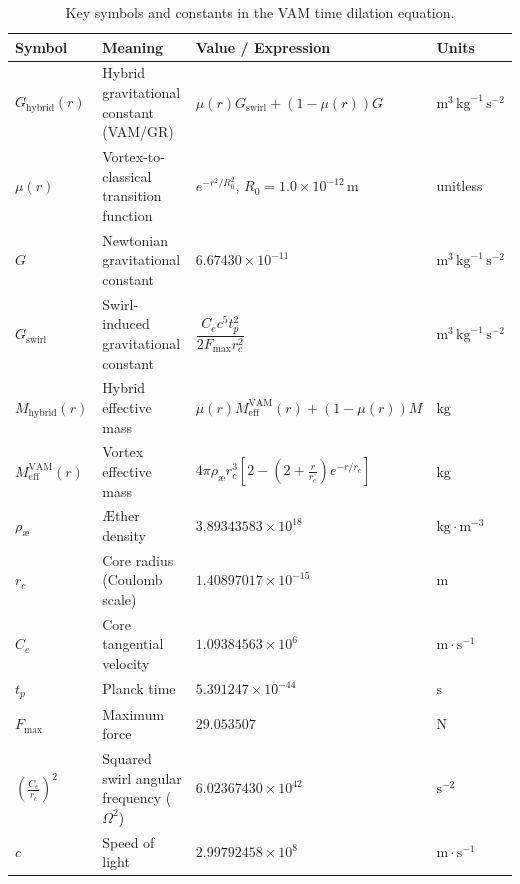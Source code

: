 \begin{table}[h]
      \centering
      \begin{tabular}{llll}
          \toprule
          \textbf{Symbol} & \textbf{Meaning} & \textbf{Value / Expression} & \textbf{Units} \\
          \midrule
        $G_{\text{hybrid}}(r)$ & Hybrid gravitational constant (VAM/GR) & $\mu(r) G_{\text{swirl}} + (1 - \mu(r)) G$ & $\text{m}^3\,\text{kg}^{-1}\,\text{s}^{-2}$ \\
        $\mu(r)$ & Vortex-to-classical transition function & $e^{-r^2 / R_0^2}$, $R_0 = 1.0 \times 10^{-12}\,\text{m}$ & unitless \\
        $G$ & Newtonian gravitational constant & $6.67430 \times 10^{-11}$ & $\text{m}^3\,\text{kg}^{-1}\,\text{s}^{-2}$ \\
        $G_{\text{swirl}}$ & Swirl-induced gravitational constant & $\dfrac{C_e c^5 t_p^2}{2 F_{\max} r_c^2}$ & $\text{m}^3\,\text{kg}^{-1}\,\text{s}^{-2}$ \\
        $M_{\text{hybrid}}(r)$ & Hybrid effective mass & $\mu(r) M_\text{eff}^\text{VAM}(r) + (1 - \mu(r)) M$ & $\text{kg}$ \\
        $M_\text{eff}^\text{VAM}(r)$ & Vortex effective mass & $4\pi \rho_\text{\ae} r_c^3 \left[ 2 - (2 + \frac{r}{r_c}) e^{-r/r_c} \right]$ & $\text{kg}$ \\
        $\rho_\text{\ae}$ & Æther density & $3.89343583 \times 10^{18}$ & $\text{kg}\cdot\text{m}^{-3}$ \\
        $r_c$ & Core radius (Coulomb scale) & $1.40897017 \times 10^{-15}$ & $\text{m}$ \\
        $C_e$ & Core tangential velocity & $1.09384563 \times 10^{6}$ & $\text{m}\cdot\text{s}^{-1}$ \\
        $t_p$ & Planck time & $5.391247 \times 10^{-44}$ & $\text{s}$ \\
        $F_{\max}$ & Maximum force & $29.053507$ & $\text{N}$ \\
        $\left(\frac{C_e}{r_c}\right)^2$ & Squared swirl angular frequency ($\Omega^2$) & $6.02367430 \times 10^{42}$ & $\text{s}^{-2}$ \\
        $c$ & Speed of light & $2.99792458 \times 10^8$ & $\text{m}\cdot\text{s}^{-1}$ \\
          \bottomrule
      \end{tabular}
    \caption{Key symbols and constants in the VAM time dilation equation.}
      \label{tab:time_dilation_symbols}
  \end{table}

